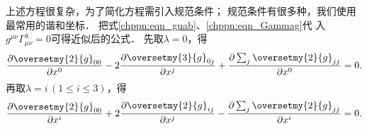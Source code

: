上述方程很复杂，为了简化方程需引入规范条件；
规范条件有很多种，我们使用最常用的谐和坐标．
把式\eqref{chppn:eqn_guab}、\eqref{chppn:eqn_Gammag}代
入$g^{\mu\nu}\Gamma^\lambda_{\mu\nu}=0$可得近似后的公式．
先取$\lambda=0$，得
\begin{equation}\label{chppn:eqn_gauge03}
    \frac{\partial \oversetmy{2}{g}_{00}} {\partial x^0}
    -2\frac{\partial \oversetmy{3}{g}_{0j} }{\partial x^j}
    +\frac{\partial \sum_{j}\oversetmy{2}{g}_{jj} }{\partial x^0} =0 .
\end{equation}
再取$\lambda=i \, (1\leqslant i \leqslant 3)$，得
\begin{equation}\label{chppn:eqn_gaugei2}
    \frac{\partial \oversetmy{2}{g}_{00}} {\partial x^i}
    + 2\frac{\partial \oversetmy{2}{g}_{ij}} {\partial x^j}
    - \frac{\partial \sum_{j}\oversetmy{2}{g}_{jj}} {\partial x^i} =0 .
\end{equation}
